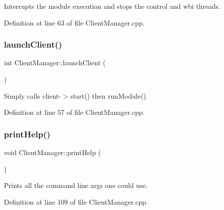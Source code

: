 Interrupts the module execution and stops the control and wbi threads. 

Definition at line 63 of file Client\+Manager.\+cpp.

\hypertarget{classocra__recipes_1_1ClientManager_a443fb4edc4bac1c1e24e32f26a730519}{}\label{classocra__recipes_1_1ClientManager_a443fb4edc4bac1c1e24e32f26a730519} 
\subsubsection{\texorpdfstring{launch\+Client()}{launchClient()}}
{\footnotesize\ttfamily int Client\+Manager\+::launch\+Client (\begin{DoxyParamCaption}{ }\end{DoxyParamCaption})}

Simply calls client-\/$>$start() then run\+Module() 

Definition at line 57 of file Client\+Manager.\+cpp.

\hypertarget{classocra__recipes_1_1ClientManager_aa935699ac8fe135a066ce69f7ebc6d0d}{}\label{classocra__recipes_1_1ClientManager_aa935699ac8fe135a066ce69f7ebc6d0d} 
\subsubsection{\texorpdfstring{print\+Help()}{printHelp()}}
{\footnotesize\ttfamily void Client\+Manager\+::print\+Help (\begin{DoxyParamCaption}{ }\end{DoxyParamCaption})}

Prints all the command line args one could use. 

Definition at line 109 of file Client\+Manager.\+cpp.

\hypertarget{classocra__recipes_1_1ClientManager_a2fb40c4d2440367c4f66ad5815e6b1f8}{}\label{classocra__recipes_1_1ClientManager_a2fb40c4d2440367c4f66ad5815e6b1f8} 
